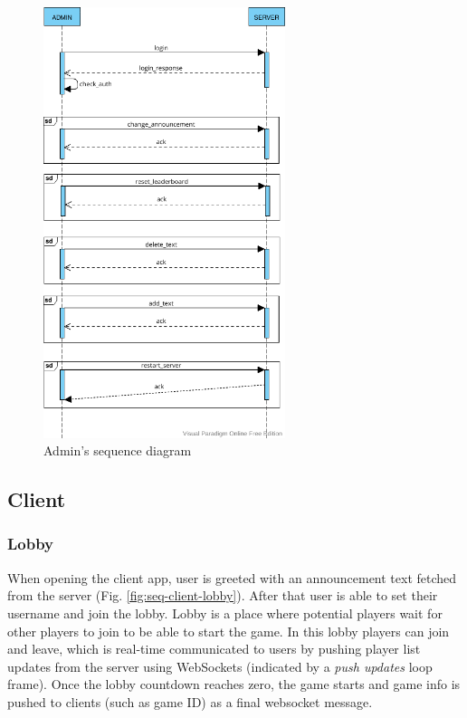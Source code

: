 \documentclass[titlepage]{article}
\newcommand{\figref}[1]{{(Fig. \hypersetup{linkcolor=blue}\ref{#1})}}
\begin{document}
\begin{figure}[H]
	\centering
	\includegraphics[width=0.63\textwidth]{seq_diagram_admin.png}
	\caption{Admin's sequence diagram}
	\label{fig:seq-admin}
\end{figure}


\subsection{Client}

\subsubsection{Lobby}

When opening the client app, user is greeted with an announcement text fetched from the server \figref{fig:seq-client-lobby}. After that user is able to set their username and join the lobby. Lobby is a place where potential players wait for other players to join to be able to start the game. In this lobby players can join and leave, which is real-time communicated to users by pushing player list updates from the server using WebSockets (indicated by a \textit{push updates} loop frame). Once the lobby countdown reaches zero, the game starts and game info is pushed to clients (such as game ID) as a final websocket message.
\end{document}
